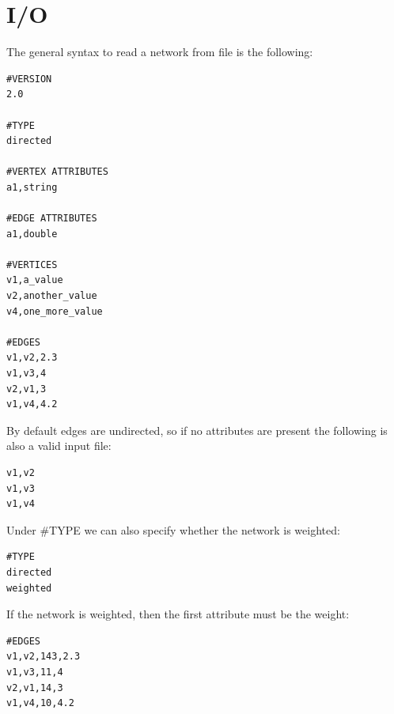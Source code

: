 \section{I/O}

The general syntax to read a network from file is the following:

\begin{lstlisting}[style=file]
#VERSION           
2.0                
                   
#TYPE              
directed           
                   
#VERTEX ATTRIBUTES 
a1,string          
                   
#EDGE ATTRIBUTES   
a1,double          
                   
#VERTICES          
v1,a_value         
v2,another_value   
v4,one_more_value  
                   
#EDGES             
v1,v2,2.3          
v1,v3,4            
v2,v1,3            
v1,v4,4.2          
\end{lstlisting}
    
By default edges are undirected, so if no attributes are present the following is also a valid input file:
\begin{lstlisting}[style=file]
v1,v2              
v1,v3              
v1,v4              
\end{lstlisting}

Under \#TYPE we can also specify whether the network is weighted:
\begin{lstlisting}[style=file]  
#TYPE              
directed           
weighted    
\end{lstlisting}        
           
If the network is weighted, then the first attribute must be the weight:
\begin{lstlisting}[style=file]         
#EDGES             
v1,v2,143,2.3      
v1,v3,11,4         
v2,v1,14,3         
v1,v4,10,4.2       
\end{lstlisting}
    
